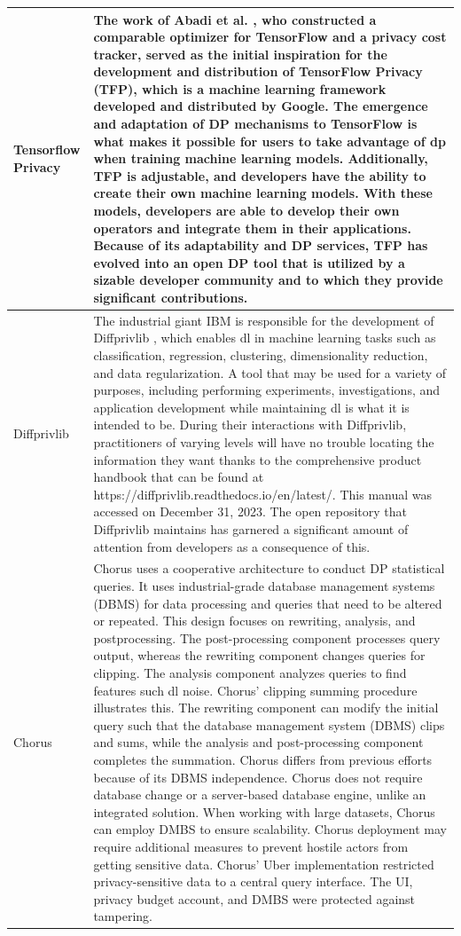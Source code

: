 \begin{longtable}{| p{} | p{} |}
    \hline
    Tensorflow Privacy & The work of Abadi et al. \cite{tf-dp1}, who constructed a comparable optimizer for TensorFlow and a privacy cost tracker, served as the initial inspiration for the development and distribution of TensorFlow Privacy \cite{tf-dp2} (TFP), which is a machine learning framework developed and distributed by Google. The emergence and adaptation of DP mechanisms to TensorFlow is what makes it possible for users to take advantage of \acrshort{dp} when training machine learning models. Additionally, TFP is adjustable, and developers have the ability to create their own machine learning models. With these models, developers are able to develop their own operators and integrate them in their applications. Because of its adaptability and DP services, TFP has evolved into an open DP tool that is utilized by a sizable developer community and to which they provide significant contributions. \\
    \hline
    Diffprivlib & The industrial giant IBM is responsible for the development of Diffprivlib \cite{Diffprivlib1}, which enables \acrshort{dl} in machine learning tasks such as classification, regression, clustering, dimensionality reduction, and data regularization. A tool that may be used for a variety of purposes, including performing experiments, investigations, and application development while maintaining \acrshort{dl} is what it is intended to be. During their interactions with Diffprivlib, practitioners of varying levels will have no trouble locating the information they want thanks to the comprehensive product handbook that can be found at https://diffprivlib.readthedocs.io/en/latest/. This manual was accessed on December 31, 2023. The open repository that Diffprivlib maintains \cite{Diffprivlib2} has garnered a significant amount of attention from developers as a consequence of this. \\
    \hline
    Chorus & Chorus \cite{chorus1, chorus2} uses a cooperative architecture to conduct DP statistical queries. It uses industrial-grade database management systems (DBMS) for data processing and queries that need to be altered or repeated. This design focuses on rewriting, analysis, and postprocessing. The post-processing component processes query output, whereas the rewriting component changes queries for clipping. The analysis component analyzes queries to find features such \acrshort{dl} noise. Chorus' clipping summing procedure illustrates this. The rewriting component can modify the initial query such that the database management system (DBMS) clips and sums, while the analysis and post-processing component completes the summation. Chorus differs from previous efforts because of its DBMS independence. Chorus does not require database change or a server-based database engine, unlike an integrated solution. When working with large datasets, Chorus can employ DMBS to ensure scalability. Chorus deployment may require additional measures to prevent hostile actors from getting sensitive data. Chorus' Uber implementation restricted privacy-sensitive data to a central query interface. The UI, privacy budget account, and DMBS were protected against tampering. \\

\end{longtable}
